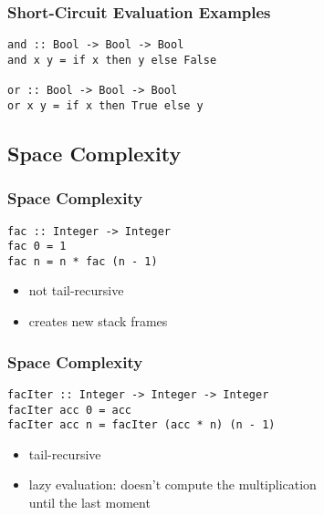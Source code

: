 \documentclass[dvipsnames]{beamer}
\theoremstyle{plain}
\begin{document}
\begin{frame}[fragile]
  \frametitle{Short-Circuit Evaluation Examples}

  \begin{exampleblock}{}
    \begin{lstlisting}[deletekeywords={and,not,or}]
and :: Bool -> Bool -> Bool
and x y = if x then y else False

or :: Bool -> Bool -> Bool
or x y = if x then True else y
    \end{lstlisting}
  \end{exampleblock}
\end{frame}

\subsection{Space Complexity}

\begin{frame}[fragile]
  \frametitle{Space Complexity}

  \begin{exampleblock}{}
    \begin{lstlisting}
fac :: Integer -> Integer
fac 0 = 1
fac n = n * fac (n - 1)
    \end{lstlisting}
  \end{exampleblock}

  \begin{itemize}
    \item not tail-recursive
    \item creates new stack frames
  \end{itemize}
\end{frame}

\begin{frame}[fragile]
  \frametitle{Space Complexity}

  \begin{exampleblock}{}
    \begin{lstlisting}
facIter :: Integer -> Integer -> Integer
facIter acc 0 = acc
facIter acc n = facIter (acc * n) (n - 1)
    \end{lstlisting}
  \end{exampleblock}

  \begin{itemize}
    \item tail-recursive
    \item lazy evaluation: doesn't compute the multiplication\\
      until the last moment
  \end{itemize}
\end{frame}
\end{document}
